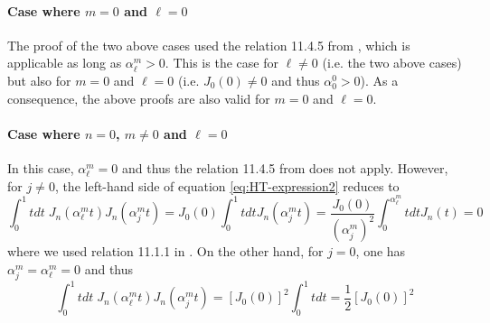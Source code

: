 \documentclass[1p,times]{elsarticle}
\begin{document}
\paragraph{Case where $m=0$ and $\ell=0$} The proof of the two above
cases used the relation 11.4.5 from \cite{Abramowitz}, which is applicable
as long as $\alpha^m_\ell > 0$. This is the case for $\ell \neq 0$
(i.e. the two above cases) but also for $m=0$ and $\ell=0$
(i.e. $J_0(0) \neq 0$ and thus $\alpha^0_0 > 0$). As a consequence,
the above proofs are also valid for $m=0$ and $\ell=0$.

\paragraph{Case where $n=0$, $m \neq 0$ and $\ell=0$}
In this case, $\alpha^m_\ell = 0$ and thus the relation 11.4.5 from
\cite{Abramowitz} does not apply. However, for $j\neq 0$, the left-hand
side of equation \cref{eq:HT-expression2} reduces to 
\begin{equation} \int_0^1 \!\!\! tdt\; J_n( \alpha_\ell^m t)  J_n( \alpha_j^m t) =
J_0(0) \int_0^1 \!\!\! tdt J_n( \alpha_j^m t) =
\frac{J_0(0)}{(\alpha_j^m)^2} \int_0^{\alpha_\ell^m} \!\!\! tdt
J_n(t)= 0\end{equation}
\noindent where we used relation 11.1.1 in \cite{Abramowitz}. On the
other hand, for $j=0$, one has $\alpha^m_j=\alpha^m_\ell=0$ and thus
\begin{equation} \int_0^1 \!\!\! tdt\; J_n( \alpha_\ell^m t)  J_n( \alpha_j^m t) =
[J_0(0)]^2 \int_0^1 \!\!\! tdt = \frac{1}{2}[J_0(0)]^2 \end{equation}





\end{document}
